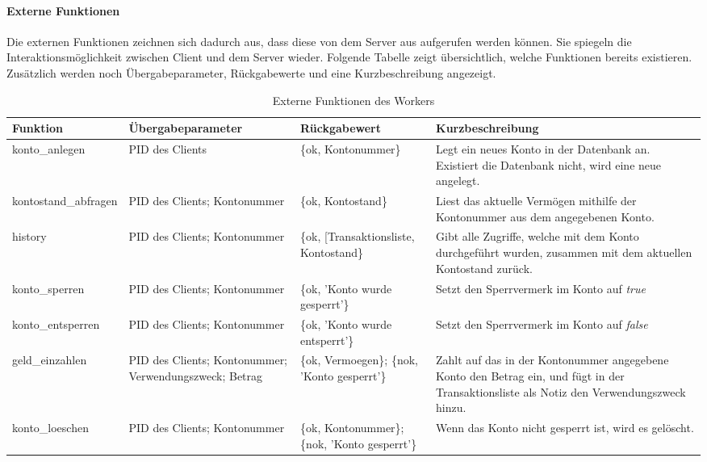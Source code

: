 \paragraph{Externe Funktionen}
Die externen Funktionen zeichnen sich dadurch aus, dass diese von dem Server aus aufgerufen werden können. Sie spiegeln die Interaktionsmöglichkeit zwischen Client und dem Server wieder. Folgende Tabelle zeigt übersichtlich, welche Funktionen bereits existieren. Zusätzlich werden noch Übergabeparameter, Rückgabewerte und eine Kurzbeschreibung angezeigt.
\\
\begin{table}
\caption{Externe Funktionen des Workers}
\begin{center}
\begin{tabular}{p{3 cm}|p{3 cm}|p{3 cm}|p{5 cm}}
Funktion & Übergabeparameter & Rückgabewert & Kurzbeschreibung \\
				\hline
				\hline
konto\_anlegen & 
PID des Clients & 
\{ok, Kontonummer\} & 
Legt ein neues Konto in der Datenbank an. Existiert die Datenbank nicht, wird eine neue angelegt.\\ \hline

kontostand\_abfragen & 
PID des Clients; Kontonummer & 
\{ok, Kontostand\} & 
Liest das aktuelle Vermögen mithilfe der Kontonummer aus dem angegebenen Konto.\\ \hline

history & 
PID des Clients; Kontonummer & 
\{ok, [Transaktionsliste, Kontostand\} & 
Gibt alle Zugriffe, welche mit dem Konto durchgeführt wurden, zusammen mit dem aktuellen Kontostand zurück.\\ \hline

konto\_sperren & 
PID des Clients; Kontonummer & 
\{ok, 'Konto wurde gesperrt'\} & 
Setzt den Sperrvermerk im Konto auf \textit{true}\\ \hline

konto\_entsperren & 
PID des Clients; Kontonummer & 
\{ok, 'Konto wurde entsperrt'\} & 
Setzt den Sperrvermerk im Konto auf \textit{false}\\ \hline

geld\_einzahlen & 
PID des Clients; Kontonummer; Verwendungszweck; Betrag & 
\{ok, Vermoegen\}; \{nok, 'Konto gesperrt'\} & 
Zahlt auf das in der Kontonummer angegebene Konto den Betrag ein, und fügt in der Transaktionsliste als Notiz den Verwendungszweck hinzu.\\ \hline

konto\_loeschen & 
PID des Clients; Kontonummer & 
\{ok, Kontonummer\}; \{nok, 'Konto gesperrt'\} & 
Wenn das Konto nicht gesperrt ist, wird es gelöscht.\\ \hline


\end{tabular}
\end{center}
\end{table}
